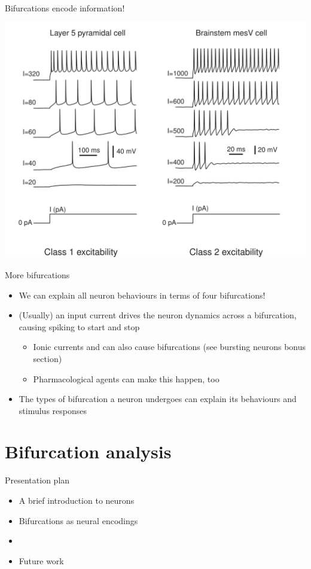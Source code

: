 \documentclass[presentation]{beamer}
\begin{document}
\begin{frame}[plain,label={sec:org6229dd6}]{Bifurcations encode information!}
\begin{center}
\includegraphics[height=1.1\textheight]{./excitability_classes.png}
\end{center}
\end{frame}

\begin{frame}[label={sec:org36aa79a}]{More bifurcations}
\begin{itemize}
\item We can explain all neuron behaviours in terms of four bifurcations!
\item (Usually) an input current drives the neuron dynamics across a bifurcation, causing spiking to start and stop
\begin{itemize}
\item Ionic currents and can also cause bifurcations (see bursting neurons bonus section)
\item Pharmacological agents can make this happen, too
\end{itemize}
\item The types of bifurcation a neuron undergoes can explain its behaviours and stimulus responses
\end{itemize}
\end{frame}


\section{Bifurcation analysis}
\label{sec:orgff2a539}
\begin{frame}[label={sec:orged98a2b}]{Presentation plan}
\begin{itemize}
\item A brief introduction to neurons
\item Bifurcations as neural encodings
\item \color{bristolred}{Methods for bifurcation analysis}
\item \color{black} Future work
\end{itemize}
\end{frame}
\end{document}
